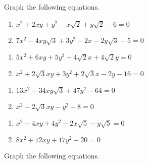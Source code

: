 Graph the following equations.

\begin{multicols}{2}

\begin{enumerate}

\item  $x^2+2xy+y^2 -x\sqrt{2}+y\sqrt{2} -6= 0$

\item  $7x^2-4xy\sqrt{3}+3y^2-2x-2y\sqrt{3}-5= 0$
\setcounter{HW}{\value{enumi}}
\end{enumerate}
\end{multicols}


\begin{multicols}{2}

\begin{enumerate}
\setcounter{enumi}{\value{HW}}

\item  $5x^2+6xy+5y^2 - 4\sqrt{2}x+4\sqrt{2}y = 0$ 
\item  $x^2+ 2\sqrt{3}xy+3y^2+ 2\sqrt{3}x-2y-16 = 0$ 

\setcounter{HW}{\value{enumi}}
\end{enumerate}
\end{multicols}


\begin{multicols}{2}
\begin{enumerate}
\setcounter{enumi}{\value{HW}}



\item  $13x^2-34xy\sqrt{3}+47y^2 - 64=0$
\item  $x^2-2\sqrt{3} xy-y^2+8=0$
\setcounter{HW}{\value{enumi}}
\end{enumerate}
\end{multicols}






\begin{multicols}{2}
\begin{enumerate}
\setcounter{enumi}{\value{HW}}

\item  $x^2-4xy+4y^2-2x\sqrt{5}-y\sqrt{5}=0$

\item  $8x^2+12xy+17y^2 - 20 = 0$
\setcounter{HW}{\value{enumi}}
\end{enumerate}
\end{multicols}


Graph the following equations.


